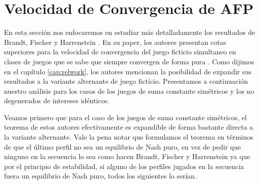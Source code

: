 \section{Velocidad de Convergencia de AFP} \label{sec:aportes:velocidad}

En esta sección nos enfocaremos en estudiar más detalladamente los resultados de Brandt, Fischer y Harrenstein \cite{brandt:rate:convergence}. En su paper, los autores presentan cotas superiores para la velocidad de convergencia del juego ficticio simultaneo en clases de juegos que se sabe que siempre convergen de forma pura . Como dijimos en el capítulo \ref{cap:relwork}, los autores mencionan la posibilidad de expandir sus resultados a la variante alternante de juego ficticio. Presentamos a continuación nuestro análisis para los casos de los juegos de suma constante simétricos y los no degenerados de intereses idénticos.



Veamos primero que para el caso de los juegos de suma constante simétricos, el teorema de estos autores efectivamente es expandible de forma bastante directa a la variante alternante. Vale la pena notar que formulamos el teorema en términos de que el último perfil no sea un equilibrio de Nash puro, en vez de pedir que ninguno en la secuencia lo sea como hacen Brandt, Fischer y Harrenstein ya que por el principio de estabilidad, si alguno de los perfiles jugados en la secuencia fuera un equilibrio de Nash puro, todos los siguientes lo serían.

